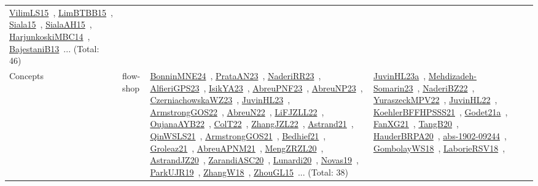 {\begin{longtable}{lp{3cm}>{\raggedright\arraybackslash}p{6cm}>{\raggedright\arraybackslash}p{6cm}>{\raggedright\arraybackslash}p{8cm}}
\href{../works/VilimLS15.pdf}{VilimLS15}~\cite{VilimLS15}, \href{../works/LimBTBB15.pdf}{LimBTBB15}~\cite{LimBTBB15}, \href{../works/Siala15.pdf}{Siala15}~\cite{Siala15}, \href{../works/SialaAH15.pdf}{SialaAH15}~\cite{SialaAH15}, \href{../works/HarjunkoskiMBC14.pdf}{HarjunkoskiMBC14}~\cite{HarjunkoskiMBC14}, \href{../works/BajestaniB13.pdf}{BajestaniB13}~\cite{BajestaniB13}... (Total: 46)\\
Concepts & flow-shop & \href{../works/BonninMNE24.pdf}{BonninMNE24}~\cite{BonninMNE24}, \href{../works/PrataAN23.pdf}{PrataAN23}~\cite{PrataAN23}, \href{../works/NaderiRR23.pdf}{NaderiRR23}~\cite{NaderiRR23}, \href{../works/AlfieriGPS23.pdf}{AlfieriGPS23}~\cite{AlfieriGPS23}, \href{../works/IsikYA23.pdf}{IsikYA23}~\cite{IsikYA23}, \href{../works/AbreuPNF23.pdf}{AbreuPNF23}~\cite{AbreuPNF23}, \href{../works/AbreuNP23.pdf}{AbreuNP23}~\cite{AbreuNP23}, \href{../works/CzerniachowskaWZ23.pdf}{CzerniachowskaWZ23}~\cite{CzerniachowskaWZ23}, \href{../works/JuvinHL23.pdf}{JuvinHL23}~\cite{JuvinHL23}, \href{../works/ArmstrongGOS22.pdf}{ArmstrongGOS22}~\cite{ArmstrongGOS22}, \href{../works/AbreuN22.pdf}{AbreuN22}~\cite{AbreuN22}, \href{../works/LiFJZLL22.pdf}{LiFJZLL22}~\cite{LiFJZLL22}, \href{../works/OujanaAYB22.pdf}{OujanaAYB22}~\cite{OujanaAYB22}, \href{../works/ColT22.pdf}{ColT22}~\cite{ColT22}, \href{../works/ZhangJZL22.pdf}{ZhangJZL22}~\cite{ZhangJZL22}, \href{../works/Astrand21.pdf}{Astrand21}~\cite{Astrand21}, \href{../works/QinWSLS21.pdf}{QinWSLS21}~\cite{QinWSLS21}, \href{../works/ArmstrongGOS21.pdf}{ArmstrongGOS21}~\cite{ArmstrongGOS21}, \href{../works/Bedhief21.pdf}{Bedhief21}~\cite{Bedhief21}, \href{../works/Groleaz21.pdf}{Groleaz21}~\cite{Groleaz21}, \href{../works/AbreuAPNM21.pdf}{AbreuAPNM21}~\cite{AbreuAPNM21}, \href{../works/MengZRZL20.pdf}{MengZRZL20}~\cite{MengZRZL20}, \href{../works/AstrandJZ20.pdf}{AstrandJZ20}~\cite{AstrandJZ20}, \href{../works/ZarandiASC20.pdf}{ZarandiASC20}~\cite{ZarandiASC20}, \href{../works/Lunardi20.pdf}{Lunardi20}~\cite{Lunardi20}, \href{../works/Novas19.pdf}{Novas19}~\cite{Novas19}, \href{../works/ParkUJR19.pdf}{ParkUJR19}~\cite{ParkUJR19}, \href{../works/ZhangW18.pdf}{ZhangW18}~\cite{ZhangW18}, \href{../works/ZhouGL15.pdf}{ZhouGL15}~\cite{ZhouGL15}... (Total: 38) & \href{../works/JuvinHL23a.pdf}{JuvinHL23a}~\cite{JuvinHL23a}, \href{../works/Mehdizadeh-Somarin23.pdf}{Mehdizadeh-Somarin23}~\cite{Mehdizadeh-Somarin23}, \href{../works/NaderiBZ22.pdf}{NaderiBZ22}~\cite{NaderiBZ22}, \href{../works/YuraszeckMPV22.pdf}{YuraszeckMPV22}~\cite{YuraszeckMPV22}, \href{../works/JuvinHL22.pdf}{JuvinHL22}~\cite{JuvinHL22}, \href{../works/KoehlerBFFHPSSS21.pdf}{KoehlerBFFHPSSS21}~\cite{KoehlerBFFHPSSS21}, \href{../works/Godet21a.pdf}{Godet21a}~\cite{Godet21a}, \href{../works/FanXG21.pdf}{FanXG21}~\cite{FanXG21}, \href{../works/TangB20.pdf}{TangB20}~\cite{TangB20}, \href{../works/HauderBRPA20.pdf}{HauderBRPA20}~\cite{HauderBRPA20}, \href{../works/abs-1902-09244.pdf}{abs-1902-09244}~\cite{abs-1902-09244}, \href{../works/GombolayWS18.pdf}{GombolayWS18}~\cite{GombolayWS18}, \href{../works/LaborieRSV18.pdf}{LaborieRSV18}~\cite{LaborieRSV18}, 
\end{longtable}}
